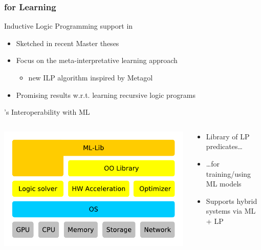 \documentclass[presentation]{beamer}\mode<presentation>{\usetheme{AMSBolognaFC}}
\begin{document}
\subsubsection{\twopkt{} for Learning}

\begin{frame}{Inductive Logic Programming support in \twopkt{}}
    \begin{itemize}
        \item Sketched in recent \alert{Master theses}
        
        \vfill

        \item Focus on the \alert{meta-interpretative learning} approach
        \begin{itemize}
            \item new ILP algorithm inspired by Metagol
        \end{itemize}

        \vfill

        \item Promising results w.r.t. learning \alert{recursive} logic programs
    \end{itemize}
\end{frame}

\begin{frame}{\twopkt{}'s Interoperability with ML}
    \begin{columns}
        \begin{column}{.35\linewidth}
            \includegraphics[width=\linewidth]{figures/layers.pdf}
        \end{column}
        \begin{column}{.65\linewidth}
            \begin{itemize}
                \item \alert{Library} of LP predicates\ldots
                \item \ldots for \alert{training/using} ML models
                \item Supports hybrid systems via \alert{ML + LP}
            \end{itemize}
        \end{column}
    \end{columns}
\end{frame}
\end{document}
